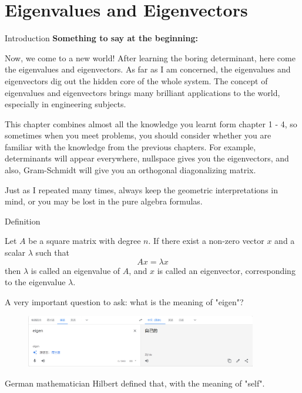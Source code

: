 \documentclass{beamer}
\begin{document}
\section{Eigenvalues and Eigenvectors}
\begin{frame}{Introduction}
\textbf{Something to say at the beginning:}

\vspace{3pt}
Now, we come to a new world! After learning the boring determinant, here come the eigenvalues and eigenvectors. As far as I am concerned, the eigenvalues and eigenvectors dig out the hidden core of the whole system. The concept of eigenvalues and eigenvectors brings many brilliant applications to the world, especially in engineering subjects.

\vspace{3pt}
This chapter combines almost all the knowledge you learnt form chapter 1 - 4, so sometimes when you meet problems, you should consider whether you are familiar with the knowledge from the previous chapters. For example, determinants will appear everywhere, nullspace gives you the eigenvectors, and also, Gram-Schmidt will give you an orthogonal diagonalizing matrix.

\vspace{3pt}
Just as I repeated many times, always keep the geometric interpretations in mind, or you may be lost in the pure algebra formulas.


\end{frame}

\begin{frame}{Definition}
    \begin{definition}
        Let $A$ be a square matrix with degree $n$. If there exist a non-zero vector $x$ and a scalar $\lambda$ such that
        \begin{equation*}
            Ax=\lambda x
        \end{equation*}
        then $\lambda$ is called an eigenvalue of $A$, and $x$ is called an eigenvector, corresponding to the eigenvalue $\lambda$.
    \end{definition}

A very important question to ask: what is the meaning of "eigen"?
\begin{figure}
    \centering
    \includegraphics[width=0.9\textwidth]{eigen.png}
\end{figure}
German mathematician Hilbert defined that, with the meaning of "self".
\end{frame}
\end{document}
